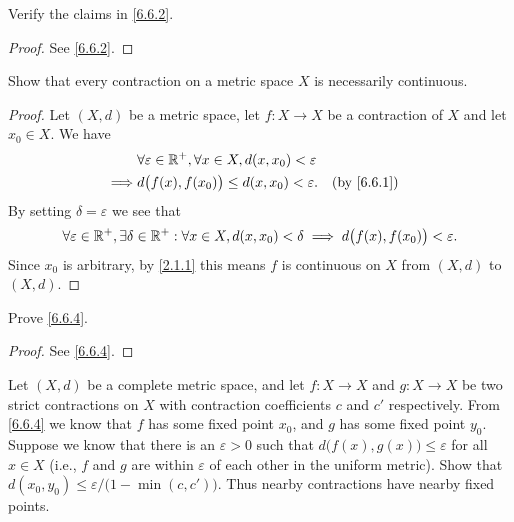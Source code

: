 \begin{ex}\label{ex:6.6.5}
  Verify the claims in \cref{6.6.2}.
\end{ex}

\begin{proof}
  See \cref{6.6.2}.
\end{proof}

\begin{ex}\label{ex:6.6.6}
  Show that every contraction on a metric space \(X\) is necessarily continuous.
\end{ex}

\begin{proof}
  Let \((X, d)\) be a metric space, let \(f : X \to X\) be a contraction of \(X\) and let \(x_0 \in X\).
  We have
  \begin{align*}
             & \forall \varepsilon \in \R^+, \forall x \in X, d(x, x_0) < \varepsilon                 \\
    \implies & d\big(f(x), f(x_0)\big) \leq d(x, x_0) < \varepsilon.                  &  & \by{6.6.1}
  \end{align*}
  By setting \(\delta = \varepsilon\) we see that
  \[
    \forall \varepsilon \in \mathbb{R}^+, \exists \delta \in \mathbb{R}^+ : \forall x \in X, d(x, x_0) < \delta \implies d\big(f(x), f(x_0)\big) < \varepsilon.
  \]
  Since \(x_0\) is arbitrary, by \cref{2.1.1} this means \(f\) is continuous on \(X\) from \((X, d)\) to \((X, d)\).
\end{proof}

\begin{ex}\label{ex:6.6.7}
  Prove \cref{6.6.4}.
\end{ex}

\begin{proof}
  See \cref{6.6.4}.
\end{proof}

\begin{ex}\label{ex:6.6.8}
  Let \((X, d)\) be a complete metric space, and let \(f : X \to X\) and \(g : X \to X\) be two strict contractions on \(X\) with contraction coefficients \(c\) and \(c'\) respectively.
  From \cref{6.6.4} we know that \(f\) has some fixed point \(x_0\), and \(g\) has some fixed point \(y_0\).
  Suppose we know that there is an \(\varepsilon > 0\) such that \(d\big(f(x), g(x)\big) \leq \varepsilon\) for all \(x \in X\)
  (i.e., \(f\) and \(g\) are within \(\varepsilon\) of each other in the uniform metric).
  Show that \(d(x_0, y_0) \leq \varepsilon / \big(1 - \min(c, c')\big)\).
  Thus nearby contractions have nearby fixed points.
\end{ex}

